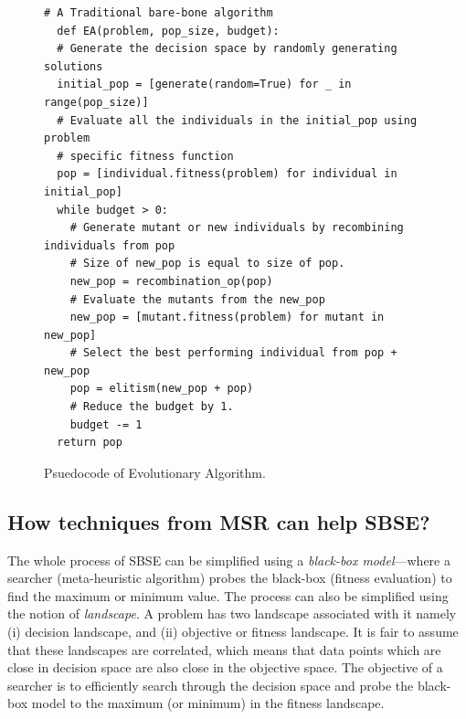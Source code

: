 \documentclass[table, xcdraw, sigconf,review, anonymous]{acmart}
\begin{document}
\begin{figure}[t]
\small
\hspace{0.4cm}\begin{lstlisting}[xrightmargin=5.0ex,mathescape,frame=none,numbers=right]
  # A Traditional bare-bone algorithm
  def EA(problem, pop_size, budget):
  # Generate the decision space by randomly generating solutions
  initial_pop = [generate(random=True) for _ in range(pop_size)]
  # Evaluate all the individuals in the initial_pop using problem 
  # specific fitness function
  pop = [individual.fitness(problem) for individual in initial_pop]
  while budget > 0:
    # Generate mutant or new individuals by recombining individuals from pop
    # Size of new_pop is equal to size of pop.
    new_pop = recombination_op(pop)
    # Evaluate the mutants from the new_pop
    new_pop = [mutant.fitness(problem) for mutant in new_pop]
    # Select the best performing individual from pop + new_pop
    pop = elitism(new_pop + pop)
    # Reduce the budget by 1. 
    budget -= 1
  return pop

\end{lstlisting}
\caption{\small{Psuedocode of Evolutionary Algorithm.}
}
\label{fig:EA}  
\end{figure}

\subsection{How techniques from MSR can help SBSE?}\label{sec:help}

The whole process of SBSE can be simplified using a \textit{black-box model}---where a searcher (meta-heuristic algorithm) probes the black-box (fitness evaluation) to find the maximum or minimum value. The process can also be simplified using the notion of \textit{landscape}. A problem has two landscape associated with it namely (i) decision landscape, and (ii) objective or fitness landscape. It is fair to assume that these landscapes are correlated, which means that data points which are close in decision space are also close in the objective space. 
The objective of a searcher is to efficiently search through the decision space and probe the black-box model to the maximum (or minimum) in the fitness landscape.
\end{document}
